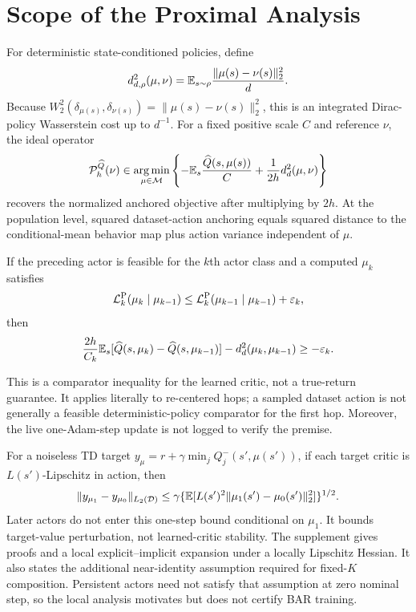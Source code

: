 \section{Scope of the Proximal Analysis}
\label{sec:theory}

For deterministic state-conditioned policies, define
\begin{equation}
 d_{d,\rho}^2(\mu,\nu)=\mathbb E_{s\sim\rho}\frac{\|\mu(s)-\nu(s)\|_2^2}{d}.
\end{equation}
Because $W_2^2(\delta_{\mu(s)},\delta_{\nu(s)})=\|\mu(s)-\nu(s)\|_2^2$, this is an integrated Dirac-policy Wasserstein cost up to $d^{-1}$. For a fixed positive scale $C$ and reference $\nu$, the ideal operator
\begin{equation}
 \mathcal P_h^{\widehat Q}(\nu)\in\operatorname*{arg\,min}_{\mu\in\mathcal M}
 \left\{-\mathbb E_s\frac{\widehat Q(s,\mu(s))}{C}
 +\frac{1}{2h}d_d^2(\mu,\nu)\right\}
\label{eq:ideal_prox}
\end{equation}
recovers the normalized anchored objective after multiplying by $2h$. At the population level, squared dataset-action anchoring equals squared distance to the conditional-mean behavior map plus action variance independent of $\mu$.

\begin{proposition}
If the preceding actor is feasible for the $k$th actor class and a computed $\mu_k$ satisfies
\begin{equation*}
 \mathcal L_k^{\rm P}(\mu_k\mid\mu_{k-1})
 \leq \mathcal L_k^{\rm P}(\mu_{k-1}\mid\mu_{k-1})+\varepsilon_k,
\end{equation*}
then
\begin{equation}
 \frac{2h}{C_k}\mathbb E_s[\widehat Q(s,\mu_k)-\widehat Q(s,\mu_{k-1})]
 -d_d^2(\mu_k,\mu_{k-1})\geq-\varepsilon_k.
\label{eq:conditional_margin}
\end{equation}
\end{proposition}
This is a comparator inequality for the learned critic, not a true-return guarantee. It applies literally to re-centered hops; a sampled dataset action is not generally a feasible deterministic-policy comparator for the first hop. Moreover, the live one-Adam-step update is not logged to verify the premise.

For a noiseless TD target $y_\mu=r+\gamma\min_jQ_j^-(s',\mu(s'))$, if each target critic is $L(s')$-Lipschitz in action, then
\begin{equation}
 \|y_{\mu_1}-y_{\mu_0}\|_{L_2(\mathcal D)}
 \leq\gamma\{\mathbb E[L(s')^2\|\mu_1(s')-\mu_0(s')\|_2^2]\}^{1/2}.
\label{eq:target_bound}
\end{equation}
Later actors do not enter this one-step bound conditional on $\mu_1$. It bounds target-value perturbation, not learned-critic stability. The supplement gives proofs and a local explicit--implicit expansion under a locally Lipschitz Hessian. It also states the additional near-identity assumption required for fixed-$K$ composition. Persistent actors need not satisfy that assumption at zero nominal step, so the local analysis motivates but does not certify BAR training.

